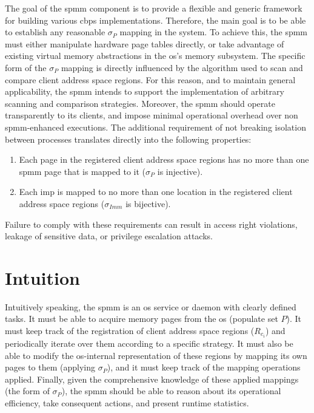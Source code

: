 The goal of the \ac{spmm} component is to provide a flexible and generic framework for building various \ac{cbps} implementations.
Therefore, the main goal is to be able to establish any reasonable $\sigma_{P}$ mapping in the system.
To achieve this, the \ac{spmm} must either manipulate hardware page tables directly, or take advantage of existing virtual memory abstractions in the \ac{os}'s memory subsystem.
The specific form of the $\sigma_{P}$ mapping is directly influenced by the algorithm used to scan and compare client address space regions.
For this reason, and to maintain general applicability, the \ac{spmm} intends to support the implementation of arbitrary scanning and comparison strategies.
Moreover, the \ac{spmm} should operate transparently to its clients, and impose minimal operational overhead over non \ac{spmm}-enhanced executions.
The additional requirement of not breaking isolation between processes translates directly into the following properties:

\begin{enumerate}
  \item Each page in the registered client address space regions has no more than one \ac{spmm} page that is mapped to it ($\sigma_{P}$ is injective).
  \item Each \ac{imp} is mapped to no more than one location in the registered client address space regions ($\sigma_{Imm} $ is bijective).
\end{enumerate}

Failure to comply with these requirements can result in access right violations, leakage of sensitive data, or privilege escalation attacks.

\section{Intuition}
\label{sec:intuition}

Intuitively speaking, the \ac{spmm} is an \ac{os} service or daemon with clearly defined tasks.
It must be able to acquire memory pages from the \ac{os} (populate set $P$).
It must keep track of the registration of client address space regions ($R_{c_i}$) and periodically iterate over them according to a specific strategy.
It must also be able to modify the \ac{os}-internal representation of these regions by mapping its own pages to them (applying $\sigma_P$), and it must keep track of the mapping operations applied.
Finally, given the comprehensive knowledge of these applied mappings (the form of $\sigma_P$), the \ac{spmm} should be able to reason about its operational efficiency, take consequent actions, and present runtime statistics.

